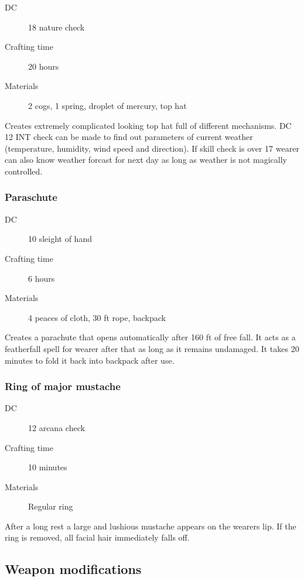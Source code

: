 \begin{description}
\item [DC] 18 nature check
\item [Crafting time] 20 hours
\item [Materials] 2 cogs, 1 spring, droplet of mercury, top hat
\end{description}

Creates extremely complicated looking top hat full of different mechanisms. DC 12 INT check can be made to find out parameters of current weather (temperature, humidity, wind speed and direction). If skill check is over 17 wearer can also know weather forcast for next day as long as weather is not magically controlled.

\subsubsection{Paraschute}

\begin{description}
\item [DC] 10 sleight of hand
\item [Crafting time] 6 hours
\item [Materials] 4 peaces of cloth, 30 ft rope, backpack
\end{description}

Creates a parachute that opens automatically after 160 ft of free fall. It acts as a featherfall spell for wearer after that as long as it remains undamaged. It takes 20 minutes to fold it back into backpack after use.

\subsubsection{Ring of major mustache}

\begin{description}
\item [DC] 12 arcana check
\item [Crafting time] 10 minutes
\item [Materials] Regular ring
\end{description}

After a long rest a large and lushious mustache appears on the wearers lip. If the ring is removed, all facial hair immediately falls off.

\subsection{Weapon modifications}

